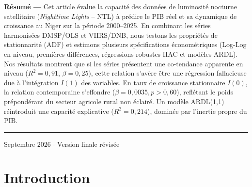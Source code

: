 \begin{titlepage}
    \begin{mdframed}[
        linecolor=accentblue,
        linewidth=1.2pt,
        topline=false,
        bottomline=false,
        rightline=false,
        backgroundcolor=lightgraybg,
        innerleftmargin=12pt,
        innerrightmargin=12pt,
        innertopmargin=10pt,
        innerbottommargin=10pt
    ]
        \small \setlength{\parskip}{0.3em}
        \textbf{\color{navyblue}Résumé ---} Cet article évalue la capacité des données de luminosité nocturne satellitaire (\textit{Nighttime Lights} -- NTL) à prédire le PIB réel et sa dynamique de croissance au Niger sur la période 2000--2025. En combinant les séries harmonisées DMSP/OLS et VIIRS/DNB, nous testons les propriétés de stationnarité (ADF) et estimons plusieurs spécifications économétriques (Log-Log en niveau, premières différences, régressions robustes HAC et modèles ARDL). Nos résultats montrent que si les séries présentent une co-tendance apparente en niveau ($R^2 = 0{,}91$, $\beta = 0{,}25$), cette relation s'avère être une régression fallacieuse due à l'intégration $I(1)$ des variables. En taux de croissance stationnaire $I(0)$, la relation contemporaine s'effondre ($\beta = 0{,}0035, p > 0{,}60$), reflétant le poids prépondérant du secteur agricole rural non éclairé. Un modèle ARDL(1,1) réintroduit une capacité explicative ($R^2 = 0{,}214$), dominée par l'inertie propre du PIB.
    \end{mdframed}

    \vfill

    {\color{accentblue}\rule{\textwidth}{0.6pt}}\par
    \vspace{0.35cm}
    {\small\color{darkgray} Septembre 2026 $\cdot$ Version finale révisée}
    
\end{titlepage}

\newpage
\tableofcontents
\newpage

\section{Introduction}\label{sec:intro}

